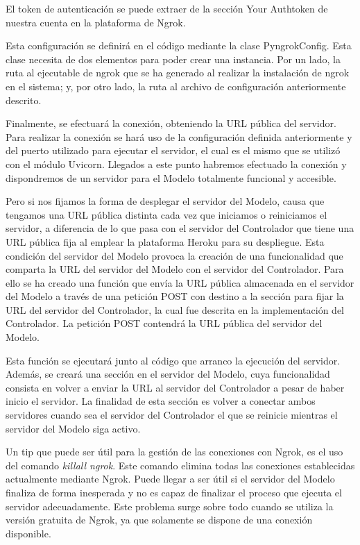 El token de autenticación se puede extraer de la sección Your Authtoken de nuestra cuenta en la plataforma de Ngrok.

Esta configuración se definirá en el código mediante la clase PyngrokConfig. Esta clase necesita de dos elementos para poder crear una instancia. Por un lado, la ruta al ejecutable de ngrok que se ha generado al realizar la instalación de ngrok en el sistema; y, por otro lado, la ruta al archivo de configuración anteriormente descrito.

Finalmente, se efectuará la conexión, obteniendo la URL pública del servidor. Para realizar la conexión se hará uso de la configuración definida anteriormente y del puerto utilizado para ejecutar el servidor, el cual es el mismo que se utilizó con el módulo Uvicorn. Llegados a este punto habremos efectuado la conexión y dispondremos de un servidor para el Modelo totalmente funcional y accesible.

Pero si nos fijamos la forma de desplegar el servidor del Modelo, causa que tengamos una URL pública distinta cada vez que iniciamos o reiniciamos el servidor, a diferencia de lo que pasa con el servidor del Controlador que tiene una URL pública fija al emplear la plataforma Heroku para su despliegue. Esta condición del servidor del Modelo provoca la creación de una funcionalidad que comparta la URL del servidor del Modelo con el servidor del Controlador. Para ello se ha creado una función que envía la URL pública almacenada en el servidor del Modelo a través de una petición POST con destino a la sección para fijar la URL del servidor del Controlador, la cual fue descrita en la implementación del Controlador. La petición POST contendrá la URL pública del servidor del Modelo.

Esta función se ejecutará junto al código que arranco la ejecución del servidor. Además, se creará una sección en el servidor del Modelo, cuya funcionalidad consista en volver a enviar la URL al servidor del Controlador a pesar de haber inicio el servidor. La finalidad de esta sección es volver a conectar ambos servidores cuando sea el servidor del Controlador el que se reinicie mientras el servidor del Modelo siga activo.

Un tip que puede ser útil para la gestión de las conexiones con Ngrok, es el uso del comando \textit{killall ngrok}. Este comando elimina todas las conexiones establecidas actualmente mediante Ngrok. Puede llegar a ser útil si el servidor del Modelo finaliza de forma inesperada y no es capaz de finalizar el proceso que ejecuta el servidor adecuadamente. Este problema surge sobre todo cuando se utiliza la versión gratuita de Ngrok, ya que solamente se dispone de una conexión disponible.


